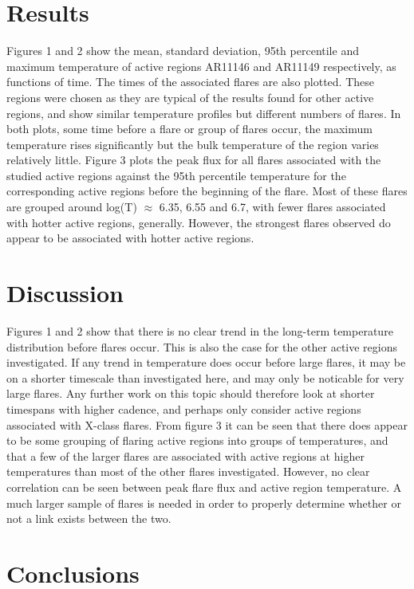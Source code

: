 \documentclass{article}
\begin{document}
\section{Results}
Figures 1 and 2 show the mean, standard deviation, 95th percentile and maximum temperature of active regions AR11146 and AR11149 respectively, as functions of time.
The times of the associated flares are also plotted. These regions were chosen as they are typical of the results found for other active regions, and show similar temperature profiles but different numbers of flares. In both plots, some time before a flare or group of flares occur, the maximum temperature rises significantly but the bulk temperature of the region varies relatively little.
Figure 3 plots the peak flux for all flares associated with the studied active regions against the 95th percentile temperature for the corresponding active regions before the beginning of the flare.
Most of these flares are grouped around log(T) $\approx$ 6.35, 6.55 and 6.7, with fewer flares associated with hotter active regions, generally.
However, the strongest flares observed do appear to be associated with hotter active regions.

\section{Discussion}
Figures 1 and 2 show that there is no clear trend in the long-term temperature distribution before flares occur.
This is also the case for the other active regions investigated. If any trend in temperature does occur before large flares, it may be on a shorter timescale than investigated here, and may only be noticable for very large flares.
Any further work on this topic should therefore look at shorter timespans with higher cadence, and perhaps only consider active regions associated with X-class flares.
From figure 3 it can be seen that there does appear to be some grouping of flaring active regions into groups of temperatures, and that a few of the larger flares are associated with active regions at higher temperatures than most of the other flares investigated.
However, no clear correlation can be seen between peak flare flux and active region temperature.
A much larger sample of flares is needed in order to properly determine whether or not a link exists between the two.

\section{Conclusions}



\end{document}
